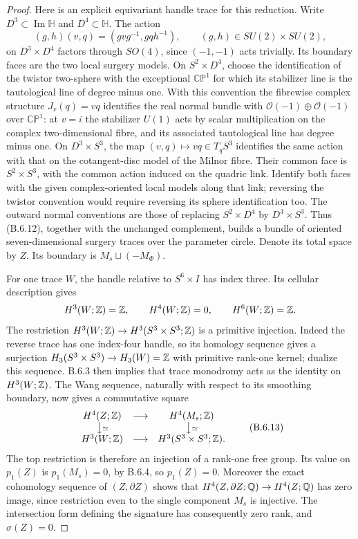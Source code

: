 \begin{proof}
Here is an explicit equivariant handle trace for this reduction.
Write $D^3\subset\operatorname{Im}\mathbb H$ and
$D^4\subset\mathbb H$. The action
\[
 (g,h)(v,q)=(gvg^{-1},gqh^{-1}),\qquad
 (g,h)\in SU(2)\times SU(2),
 \tag{B.6.12}
\]
on $D^3\times D^4$ factors through $SO(4)$, since $(-1,-1)$
acts trivially. Its boundary faces are the two local surgery
models. On $S^2\times D^4$, choose the identification of the
twistor two-sphere with the exceptional $\mathbb{CP}^1$ for
which its stabilizer line is the tautological line of degree
minus one. With this convention the fibrewise complex structure
$J_v(q)=vq$ identifies the real normal bundle with
$\mathcal O(-1)\oplus\mathcal O(-1)$ over $\mathbb{CP}^1$:
at $v=i$ the stabilizer $U(1)$ acts by scalar multiplication
on the complex two-dimensional fibre, and its associated
tautological line has degree minus one. On $D^3\times S^3$,
the map $(v,q)\mapsto vq\in T_qS^3$ identifies the same action
with that on the cotangent-disc model of the Milnor fibre.
Their common face is $S^2\times S^3$, with the common action
induced on the quadric link. Identify both faces with the
given complex-oriented local models along that link; reversing
the twistor convention would require reversing its sphere
identification too. The outward normal conventions
are those of replacing $S^2\times D^4$ by $D^3\times S^3$.
Thus (B.6.12), together with the unchanged complement, builds
a bundle of oriented seven-dimensional surgery traces over
the parameter circle. Denote its total space by $Z$. Its
boundary is $M_s\sqcup(-M_\Phi)$.

For one trace $W$, the handle relative to $S^6\times I$ has
index three. Its cellular description gives
\[
 H^3(W;\mathbb Z)=\mathbb Z,\qquad H^4(W;\mathbb Z)=0,
 \qquad H^6(W;\mathbb Z)=\mathbb Z.
\]
The restriction $H^3(W;\mathbb Z)\to H^3(S^3\times S^3;\mathbb Z)$
is a primitive injection. Indeed the reverse trace has one
index-four handle, so its homology sequence gives a surjection
$H_3(S^3\times S^3)\to H_3(W)=\mathbb Z$ with primitive rank-one
kernel; dualize this sequence. B.6.3 then implies that trace
monodromy acts as the identity on $H^3(W;\mathbb Z)$. The Wang
sequence, naturally with respect to its smoothing boundary,
now gives a commutative square
\[
 \begin{array}{ccc}
 H^4(Z;\mathbb Z)&\longrightarrow&H^4(M_s;\mathbb Z)\\
 \big\downarrow\scriptstyle\simeq&&
       \big\downarrow\scriptstyle\simeq\\
 H^3(W;\mathbb Z)&\longrightarrow&H^3(S^3\times S^3;\mathbb Z).
 \end{array}
 \tag{B.6.13}
\]
The top restriction is therefore an injection of a rank-one
free group. Its value on $p_1(Z)$ is $p_1(M_s)=0$, by B.6.4,
so $p_1(Z)=0$. Moreover the exact cohomology sequence of
$(Z,\partial Z)$ shows that
$H^4(Z,\partial Z;\mathbb Q)\to H^4(Z;\mathbb Q)$ has zero image, since
restriction even to the single component $M_s$ is injective.
The intersection form defining the signature has consequently
zero rank, and $\sigma(Z)=0$.


\end{proof}
